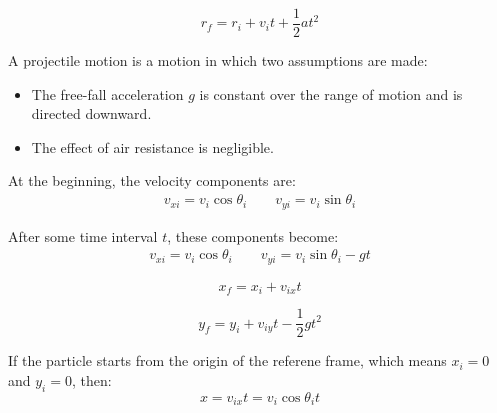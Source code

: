             \begin{equation}
                r_{f} = r_{i} + v_{i}t + \frac{1}{2} at^{2}
            \end{equation}

    \pagebreak

            \par A projectile motion is a motion in which two assumptions are made:
            \begin{itemize}
                \item The free-fall acceleration $g$ is constant over the range of motion
                and is directed downward.
                \item The effect of air resistance is negligible.
            \end{itemize}

            \par At the beginning, the velocity components are:
            \begin{equation}
                \begin{aligned}
                v_{xi} = v_{i} \cos \theta_{i} \qquad
                v_{yi} = v_{i} \sin \theta_{i}
                \end{aligned}
            \end{equation}

            \par After some time interval $t$, these components become:
            \begin{equation}
                \begin{aligned}
                v_{xi} = v_{i} \cos \theta_{i} \qquad
                v_{yi} = v_{i} \sin \theta_{i} - gt
                \end{aligned}
            \end{equation}

            \begin{equation} 
                \label{eq:01}
                x_{f} = x_{i} + v_{ix}t
            \end{equation}

            \begin{equation}
                \label{eq:02}
                y_{f} = y_{i} + v_{iy}t - \frac{1}{2} gt^{2}
            \end{equation}

            \par If the particle starts from the origin of the referene frame, which
            means $x_{i} = 0$ and $y_{i} = 0$, then:
            \begin{equation} 
                \label{eq:03}
                x = v_{ix}t = v_{i}\cos\theta_{i}t
            \end{equation}

